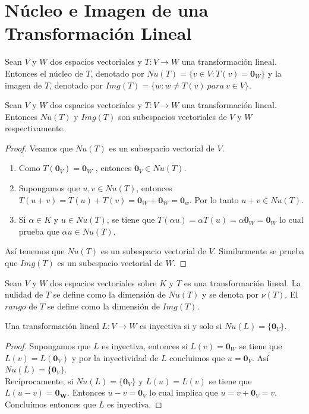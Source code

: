 \section{Núcleo e Imagen de una Transformación Lineal}
\begin{dfn}
Sean $V$ y $W$ dos espacios vectoriales y $T : V \to W$ una transformación lineal. Entonces el núcleo de $T$, denotado por $Nu(T) = \{v \in V : T(v) = \mathbf{0}_W\}$ y la imagen de $T$, denotado por $Img(T) = \{w : w \neq T(v) \ para \ v \in V\}$.
\end{dfn}

\begin{theorem}
Sean $V$ y $W$ dos espacios vectoriales y $T : V \to W$ una transformación lineal. Entonces $Nu(T)$ y $Img(T)$ son subespacios vectoriales de $V$ y $W$ respectivamente.
\end{theorem}

\begin{proof}
Veamos que $Nu(T)$ es un subespacio vectorial de $V$.
\begin{enumerate}
\item Como $T(\mathbf{0}_V)=\mathbf{0}_W$ , entonces $\mathbf{0}_V \in Nu(T)$.
\item Supongamos que $u , v \in Nu(T)$, entonces $T(u+v) = T(u) + T(v) = \mathbf{0}_W + \mathbf{0}_W = \mathbf{0}_w$. Por lo tanto $u+v \in Nu(T)$.
\item Si $\alpha \in K$ y $u \in Nu(T)$, se tiene que $T(\alpha u) = \alpha T(u) = \alpha \mathbf{0}_W = \mathbf{0}_W$ lo cual prueba que $\alpha u \in Nu(T)$.
\end{enumerate}
Así tenemos que $Nu(T)$ es un subespacio vectorial de $V$. Similarmente se prueba que $Img(T)$ es un subespacio vectorial de $W$.
\end{proof}

\begin{dfn}
Sean $V$ y $W$ dos espacios vectoriales sobre $K$ y $T$ es una transformación lineal. La nulidad de $T$ se define como la dimensión de $Nu(T)$ y se denota por $\nu (T)$. El $rango$ de $T$ se define como la dimensión de $Img(T)$.
\end{dfn}

\begin{theorem}
Una transformación lineal $L : V \to W$ es inyectiva si y solo si $Nu(L) = \{\mathbf{0}_V\}$.
\end{theorem}

\begin{proof}
Supongamos que $L$ es inyectiva, entonces si $L(v) = \mathbf{0}_W$ se tiene que $L(v) = L(\mathbf{0}_V)$ y por la inyectividad de $L$ concluimos que $u = \mathbf{0}_V$. Así $Nu(L) = \{\mathbf{0}_V\}$.\\
Recíprocamente, si $Nu(L) = \{\mathbf{0}_V\}$ y $L(u) = L(v)$ se tiene que $L(u - v) = \mathbf{0_W}$. Entonces $u -v = \mathbf{0}_V$ lo cual implica que $u = v + \mathbf{0}_V = v$. Concluimos entonces que $L$ es inyectiva.
\end{proof}

